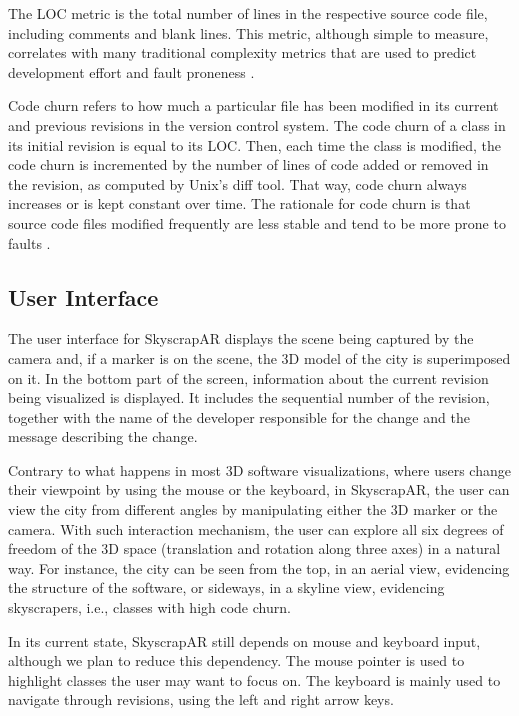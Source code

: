 The LOC metric is the total number of lines in the respective source code file, including comments and blank lines. This metric, although simple to measure, correlates with many traditional complexity metrics that are used to predict development effort and fault proneness \cite{elemam:2001}.

Code churn refers to how much a particular file has been modified in its current and previous revisions in the version control system. The code churn of a class in its initial revision is equal to its LOC. Then, each time the class is modified, the code churn is incremented by the number of lines of code added or removed in the revision, as computed by Unix's diff tool. That way, code churn always increases or is kept constant over time. The rationale for code churn is that source code files modified frequently are less stable and tend to be more prone to faults \cite{nagappan:2005}.

\subsection{User Interface} \label{sec:user_interface}
The user interface for SkyscrapAR displays the scene being captured by the camera and, if a marker is on the scene, the 3D model of the city is superimposed on it. In the bottom part of the screen, information about the current revision being visualized is displayed. It includes the sequential number of the revision, together with the name of the developer responsible for the change and the message describing the change.

Contrary to what happens in most 3D software visualizations, where users change their viewpoint by using the mouse or the keyboard, in SkyscrapAR, the user can view the city from different angles by manipulating either the 3D marker or the camera. With such interaction mechanism, the user can explore all six degrees of freedom of the 3D space (translation and rotation along three axes) in a natural way. For instance, the city can be seen from the top, in an aerial view, evidencing the structure of the software, or sideways, in a skyline view, evidencing skyscrapers, i.e., classes with high code churn.

In its current state, SkyscrapAR still depends on mouse and keyboard input, although we plan to reduce this dependency. The mouse pointer is used to highlight classes the user may want to focus on. The keyboard is mainly used to navigate through revisions, using the left and right arrow keys.


